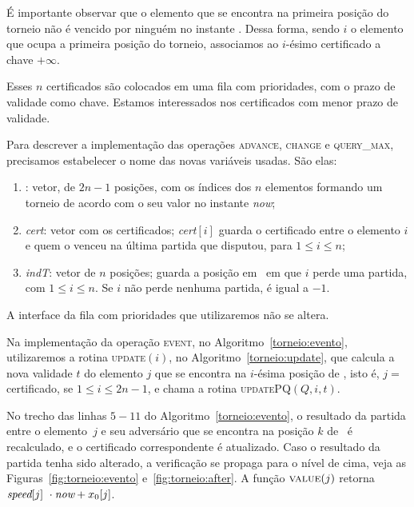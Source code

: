 

É importante observar que o elemento que se encontra na primeira posição do torneio não é vencido
por ninguém no instante \now.
Dessa forma, sendo $i$ o elemento que ocupa a primeira posição do torneio, associamos ao $i$-ésimo
certificado a chave $+\infty$.

Esses $n$ certificados são colocados em uma fila com prioridades, com o prazo de validade como
chave.
Estamos interessados nos certificados com menor prazo de validade.

Para descrever a implementação das operações \textsc{advance}, \textsc{change} e \textsc{query\_max}, precisamos estabelecer o nome das novas variáveis usadas.
São elas:
\begin{enumerate}
    \item \torneio: vetor, de $2n - 1$ posições, com os índices dos
    $n$ elementos formando um torneio de acordo com o seu valor no
    instante \textit{now};

    \item \textit{cert}: vetor com os certificados;
    \textit{cert}$[i]$ guarda o certificado entre o elemento $i$ e
    quem o venceu na última partida que disputou, para $1 \leq i \leq n$;

    \item \textit{indT}: vetor de $n$ posições; \indt[$i$] guarda a
    posição em \torneio~em que $i$ perde uma partida, com $1 \leq i
    \leq n$.
    Se $i$ não perde nenhuma partida, \indt[$i$] é igual a $-1$.
\end{enumerate}

A interface da fila com prioridades que utilizaremos não se altera.

Na implementação da operação \textsc{event}, no Algoritmo~\ref{torneio:evento}, utilizaremos a
rotina \textsc{update}$(i)$, no Algoritmo~\ref{torneio:update}, que calcula a nova validade $t$ do
elemento $j$ que se encontra na $i$-ésima posição de \torneio, isto é, $j =~$\torneio[$i$]
certificado, se $1 \leq i \leq 2n - 1$, e chama a rotina \textsc{updatePQ}$(Q, i, t)$.





No trecho das linhas $5 - 11$ do Algoritmo~\ref{torneio:evento}, o resultado da partida entre o
elemento~$j$ e seu adversário que se encontra na posição $k$ de \torneio~é recalculado, e o
certificado correspondente é atualizado.
Caso o resultado da partida tenha sido alterado, a verificação se propaga para o nível de cima,
veja as Figuras~\ref{fig:torneio:evento} e~\ref{fig:torneio:after}.
A função $\Call{value}{j}$ retorna ${\textit{speed}[j]~\cdot\textit{now} + x_0[j]}$.

